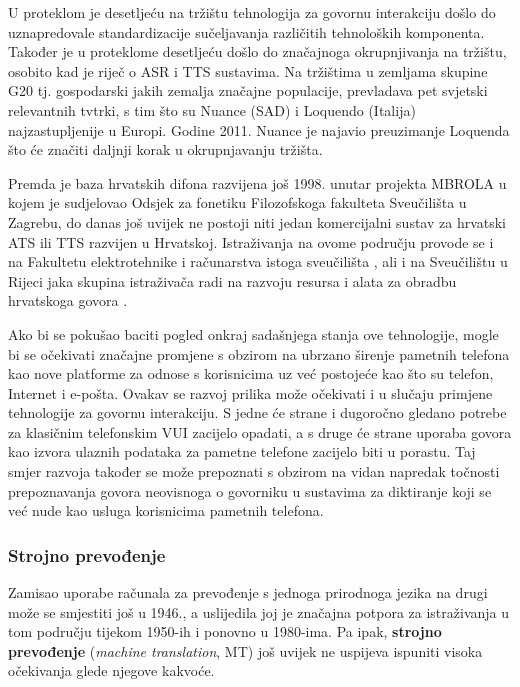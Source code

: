\begin{multicols}{2}
U proteklom je desetljeću na tržištu tehnologija za govornu interakciju došlo do uznapredovale standardizacije sučeljavanja različitih tehnoloških komponenta. Također je u proteklome desetljeću došlo do značajnoga okrupnjivanja na tržištu, osobito kad je riječ o ASR i TTS sustavima. Na tržištima u zemljama skupine G20 tj. gospodarski jakih zemalja značajne populacije, prevladava pet svjetski relevantnih tvtrki, s tim što su Nuance (SAD) i Loquendo (Italija) najzastupljenije u Europi. Godine 2011. Nuance je najavio preuzimanje Loquenda što će značiti daljnji korak u okrupnjavanju tržišta.

Premda je baza hrvatskih difona razvijena još 1998. unutar projekta MBROLA \cite{str20} u kojem je sudjelovao Odsjek za fonetiku Filozofskoga fakulteta Sveučilišta u Zagrebu, do danas još uvijek ne postoji niti jedan komercijalni sustav za hrvatski ATS ili TTS razvijen u Hrvatskoj. Istraživanja na ovome području provode se i na Fakultetu elektrotehnike i računarstva istoga sveučilišta \cite{art1}, ali i na Sveučilištu u Rijeci jaka skupina istraživača radi na razvoju resursa i alata za obradbu hrvatskoga govora \cite{art2, str21, art3}.

Ako bi se pokušao baciti pogled onkraj sadašnjega stanja ove tehnologije, mogle bi se očekivati značajne promjene s obzirom na ubrzano širenje pametnih telefona kao nove platforme za odnose s korisnicima uz već postojeće kao što su telefon, Internet i e-pošta. Ovakav se razvoj prilika može očekivati i u slučaju primjene tehnologije za govornu interakciju. S jedne će strane i dugoročno gledano potrebe za klasičnim telefonskim VUI zacijelo opadati, a s druge će strane uporaba govora kao izvora ulaznih podataka za pametne telefone zacijelo biti u porastu. Taj smjer razvoja također se može prepoznati s obzirom na vidan napredak točnosti prepoznavanja govora neovisnoga o govorniku u sustavima za diktiranje koji se već nude kao usluga korisnicima pametnih telefona.

\subsubsection{Strojno prevođenje}

Zamisao uporabe računala za prevođenje s jednoga prirodnoga jezika na drugi može se smjestiti još u 1946., a uslijedila joj je značajna potpora za istraživanja u tom području tijekom 1950-ih i ponovno u 1980-ima. Pa ipak, \textbf{strojno prevođenje} (\emph{machine translation}, MT) još uvijek ne uspijeva ispuniti visoka očekivanja glede njegove kakvoće. 


\end{multicols}
